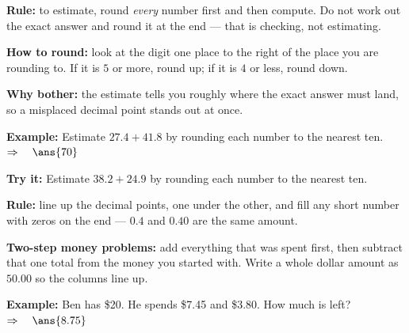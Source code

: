 \documentclass[12pt]{article}
\begin{document}


\begin{formulabox}
\textbf{Rule:} to estimate, round \emph{every} number first and then compute. Do not
work out the exact answer and round it at the end --- that is checking, not estimating.\par
\textbf{How to round:} look at the digit one place to the right of the place you are
rounding to. If it is $5$ or more, round up; if it is $4$ or less, round down.\par
\textbf{Why bother:} the estimate tells you roughly where the exact answer must land,
so a misplaced decimal point stands out at once.
\end{formulabox}

\begin{examplebox}
\textbf{Example:} Estimate $27.4 + 41.8$ by rounding each number to the nearest ten.
$\Rightarrow\quad \ans{70}$
\end{examplebox}

\begin{tryitbox}
\textbf{Try it:} Estimate $38.2 + 24.9$ by rounding each number to the nearest
ten.\\[2pt]
\end{tryitbox}


\begin{formulabox}
\textbf{Rule:} line up the decimal points, one under the other, and fill any short
number with zeros on the end --- $0.4$ and $0.40$ are the same amount.\par
\textbf{Two-step money problems:} add everything that was spent first, then subtract
that one total from the money you started with. Write a whole dollar amount as
$50.00$ so the columns line up.
\end{formulabox}

\begin{examplebox}
\textbf{Example:} Ben has \$20. He spends \$7.45 and \$3.80. How much is left?
$\Rightarrow\quad \ans{8.75}$
\end{examplebox}
\end{document}
